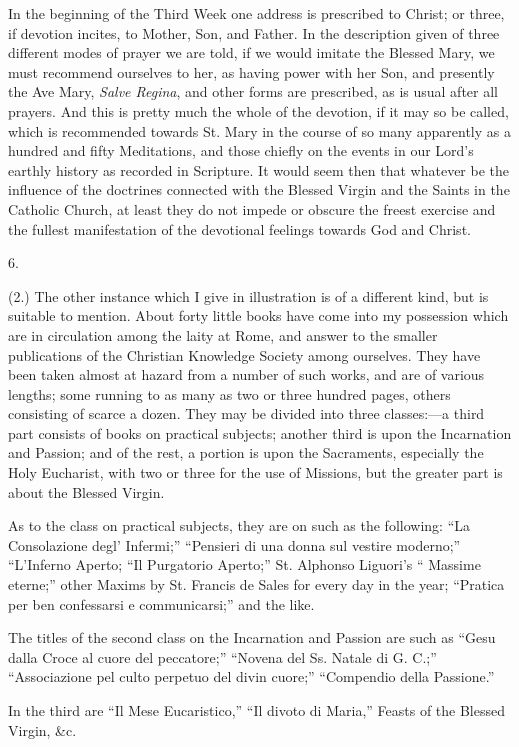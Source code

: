 In the beginning of the Third Week one address is prescribed to
Christ; or three, if devotion incites, to Mother, Son, and Father. In
the description given of three different modes of prayer we are told,
if we would imitate the Blessed Mary, we must recommend ourselves to
her, as having power with her Son, and presently the Ave Mary, \emph{Salve
Regina}, and other forms are prescribed, as is usual after all
prayers. And this is pretty much the whole of the devotion, if it may
so be called, which is recommended towards St. Mary in the course of
so many apparently as a hundred and fifty Meditations, and those
chiefly on the events in our Lord's earthly history as recorded in
Scripture. It would seem then that whatever be the influence of the
doctrines connected with the Blessed Virgin and the Saints in the
Catholic Church, at least they do not impede or obscure the freest
exercise and the fullest manifestation of the devotional feelings
towards God and Christ.

6.

(2.) The other instance which I give in illustration is of a
different kind, but is suitable to mention. About forty little books
have come into my possession which are in circulation among the laity
at Rome, and answer to the smaller publications of the Christian
Knowledge Society among ourselves. They have been taken almost at
hazard from a number of such works, and are of various lengths; some
running to as many as two or three hundred pages, others consisting of
scarce a dozen. They may be divided into three classes:—a third part
consists of books on practical subjects; another third is upon the
Incarnation and Passion; and of the rest, a portion is upon the
Sacraments, especially the Holy Eucharist, with two or three for the
use of Missions, but the greater part is about the Blessed Virgin.

As to the class on practical subjects, they are on such as the
following: ``La Consolazione degl' Infermi;'' ``Pensieri
di una donna sul vestire moderno;'' ``L'Inferno Aperto;
``Il Purgatorio Aperto;'' St. Alphonso Liguori's ``
Massime eterne;'' other Maxims by St. Francis de Sales for every
day in the year; ``Pratica per ben confessarsi e communicarsi;''
and the like.

The titles of the second class on the Incarnation and Passion are
such as ``Gesu dalla Croce al cuore del peccatore;''
``Novena del Ss. Natale di G. C.;'' ``Associazione pel
culto perpetuo del divin cuore;'' ``Compendio della Passione.''

In the third are ``Il Mese Eucaristico,'' ``Il divoto
di Maria,'' Feasts of the Blessed Virgin, \&c.

